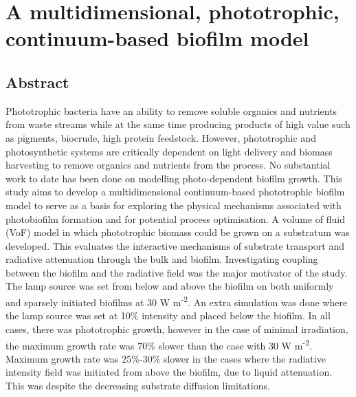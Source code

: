 \chapter[A multidimensional phototrophic biofilm model]{A multidimensional, phototrophic, continuum-based biofilm model}
\label{chap:ch4}	%
\pagestyle{headings}

\section*{Abstract}
Phototrophic bacteria have an ability to remove soluble organics and nutrients from waste streams while at the same time producing products of high value such as pigments, biocrude, high protein feedstock. 
However, phototrophic and photosynthetic systems are critically dependent on light delivery and biomass harvesting to remove organics and nutrients from the process.
No substantial work to date has been done on modelling photo-dependent biofilm growth.
This study aims to develop a multidimensional continuum-based phototrophic biofilm model to serve as a basis for exploring the physical mechanisms associated with photobiofilm formation and for potential process optimisation. 
A volume of fluid (VoF) model in which phototrophic biomass could be grown on a substratum was developed. 
This evaluates the interactive mechanisms of substrate transport and radiative attenuation through the bulk and biofilm. 
Investigating coupling between the biofilm and the radiative field was the major motivator of the study. 
The lamp source was set from below and above the biofilm on both uniformly and sparsely initiated biofilms at 30 W m\textsuperscript{-2}. An extra simulation was done where the lamp source was set at 10\% intensity and placed below the biofilm. In all cases, there was phototrophic growth, however in the case of minimal irradiation, the maximum growth rate was 70\% slower than the case with 30 W m\textsuperscript{-2}. 
Maximum growth rate was 25\%-30\% slower in the cases where the radiative intensity field was initiated from above the biofilm, due to liquid attenuation. This was despite the decreasing substrate diffusion limitations. 

